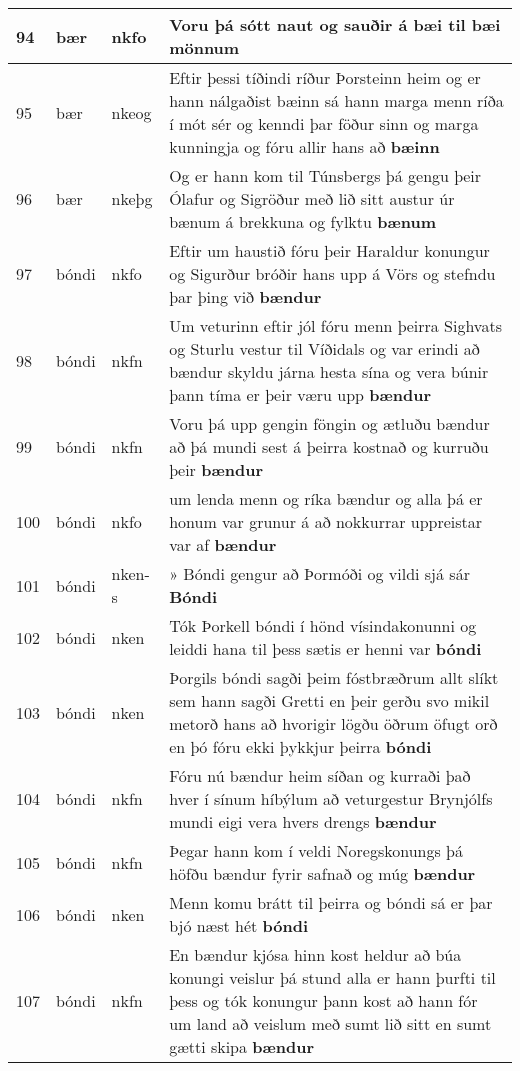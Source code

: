 \documentclass{article}
\begin{document}
\begin{longtable}{p{1cm}|p{1cm}|p{1cm}|p{13cm}}
\hline
94&bær&nkfo&Voru þá sótt naut og sauðir á bæi til \textbf{bæi} mönnum\\
\hline
95&bær&nkeog&Eftir þessi tíðindi ríður Þorsteinn heim og er hann nálgaðist bæinn sá hann marga menn ríða í mót sér og kenndi þar föður sinn og marga kunningja og fóru allir hans að \textbf{bæinn} \\
\hline
96&bær&nkeþg&Og er hann kom til Túnsbergs þá gengu þeir Ólafur og Sigröður með lið sitt austur úr bænum á brekkuna og fylktu \textbf{bænum} \\
\hline
97&bóndi&nkfo&Eftir um haustið fóru þeir Haraldur konungur og Sigurður bróðir hans upp á Vörs og stefndu þar þing við \textbf{bændur} \\
\hline
98&bóndi&nkfn&Um veturinn eftir jól fóru menn þeirra Sighvats og Sturlu vestur til Víðidals og var erindi að bændur skyldu járna hesta sína og vera búnir þann tíma er þeir væru upp \textbf{bændur} \\
\hline
99&bóndi&nkfn&Voru þá upp gengin föngin og ætluðu bændur að þá mundi sest á þeirra kostnað og kurruðu þeir \textbf{bændur} \\
\hline
100&bóndi&nkfo&um lenda menn og ríka bændur og alla þá er honum var grunur á að nokkurrar uppreistar var af \textbf{bændur} \\
\hline
101&bóndi&nken-s&» Bóndi gengur að Þormóði og vildi sjá sár \textbf{Bóndi} \\
\hline
102&bóndi&nken&Tók Þorkell bóndi í hönd vísindakonunni og leiddi hana til þess sætis er henni var \textbf{bóndi} \\
\hline
103&bóndi&nken&Þorgils bóndi sagði þeim fóstbræðrum allt slíkt sem hann sagði Gretti en þeir gerðu svo mikil metorð hans að hvorigir lögðu öðrum öfugt orð en þó fóru ekki þykkjur þeirra \textbf{bóndi} \\
\hline
104&bóndi&nkfn&Fóru nú bændur heim síðan og kurraði það hver í sínum híbýlum að veturgestur Brynjólfs mundi eigi vera hvers drengs \textbf{bændur} \\
\hline
105&bóndi&nkfn&Þegar hann kom í veldi Noregskonungs þá höfðu bændur fyrir safnað og múg \textbf{bændur} \\
\hline
106&bóndi&nken&Menn komu brátt til þeirra og bóndi sá er þar bjó næst hét \textbf{bóndi} \\
\hline
107&bóndi&nkfn&En bændur kjósa hinn kost heldur að búa konungi veislur þá stund alla er hann þurfti til þess og tók konungur þann kost að hann fór um land að veislum með sumt lið sitt en sumt gætti skipa \textbf{bændur} \\

\end{longtable}
\end{document}
